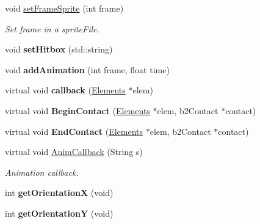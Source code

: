 \begin{DoxyCompactItemize}
\item 
void \hyperlink{class_elements_a3bb4cc2e2009d0e447fbdd0212a57b73}{set\+Frame\+Sprite} (int frame)
\begin{DoxyCompactList}\small\item\em Set frame in a sprite\+File. \end{DoxyCompactList}\item 
\hypertarget{class_elements_ad7e4ecb2ecc2402cf892e60d8d803070}{void {\bfseries set\+Hitbox} (std\+::string)}\label{class_elements_ad7e4ecb2ecc2402cf892e60d8d803070}

\item 
\hypertarget{class_elements_ac8564c0414afe21aaf6af86688a23033}{void {\bfseries add\+Animation} (int frame, float time)}\label{class_elements_ac8564c0414afe21aaf6af86688a23033}

\item 
\hypertarget{class_elements_a85bc66fe037551fcfa0b606cf32c4478}{virtual void {\bfseries callback} (\hyperlink{class_elements}{Elements} $\ast$elem)}\label{class_elements_a85bc66fe037551fcfa0b606cf32c4478}

\item 
\hypertarget{class_elements_a108938e08197adc349e98fb91abe1b5a}{virtual void {\bfseries Begin\+Contact} (\hyperlink{class_elements}{Elements} $\ast$elem, b2\+Contact $\ast$contact)}\label{class_elements_a108938e08197adc349e98fb91abe1b5a}

\item 
\hypertarget{class_elements_a42c3b694edefcc789109bd952a66d918}{virtual void {\bfseries End\+Contact} (\hyperlink{class_elements}{Elements} $\ast$elem, b2\+Contact $\ast$contact)}\label{class_elements_a42c3b694edefcc789109bd952a66d918}

\item 
virtual void \hyperlink{class_elements_a6682ad84a7d56dd6d58ba0517965b584}{Anim\+Callback} (String s)
\begin{DoxyCompactList}\small\item\em Animation callback. \end{DoxyCompactList}\item 
\hypertarget{class_elements_a2dd2e1e757c9077755bbe309c504740b}{int {\bfseries get\+Orientation\+X} (void)}\label{class_elements_a2dd2e1e757c9077755bbe309c504740b}

\item 
\hypertarget{class_elements_a58d9facbd7f6264e8b4e2ff49f20d939}{int {\bfseries get\+Orientation\+Y} (void)}\label{class_elements_a58d9facbd7f6264e8b4e2ff49f20d939}


\end{DoxyCompactItemize}
